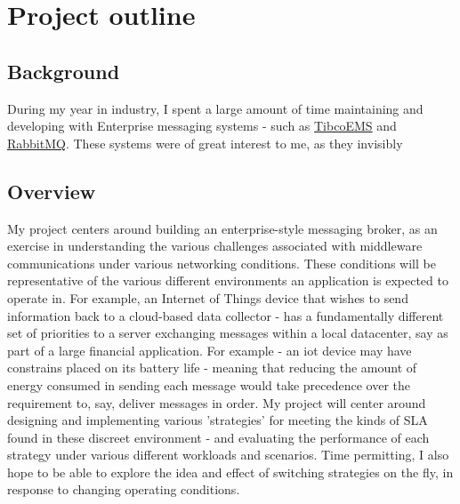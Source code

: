 \section{Project outline}
\label{sec:Project outline}

\subsection{Background}
\label{sub:Background}

During my year in industry, I spent a large amount of time maintaining and
developing with Enterprise messaging systems - such as
\href{http://www.tibco.com/products/automation/enterprise-messaging/enterprise-message-service}{TibcoEMS}
and \href{https://www.rabbitmq.com/}{RabbitMQ}. These systems were of great
interest to me, as they invisibly

\subsection{Overview}
\label{sub:Overview}

My project centers around building an enterprise-style messaging broker,
as an exercise in understanding the various challenges associated with middleware
communications under various networking conditions. These conditions will be
representative of the various different environments an application is expected
to operate in. For example, an Internet of Things device that wishes to send information back
to a cloud-based data collector - has a fundamentally different set of priorities
to a server exchanging messages within a local datacenter, say as part of a large
financial application. For example - an \gls{iot} device may
have constrains placed on its battery life - meaning that reducing the amount of
energy consumed in sending each message would take precedence over the
requirement to, say, deliver messages in order. My project will center around
designing and implementing various 'strategies' for meeting the kinds of SLA
found in these discreet environment - and evaluating the performance of each
strategy under various different workloads and scenarios. Time permitting,
I also hope to be able to explore the idea and effect of switching strategies
on the fly, in response to changing operating conditions.
